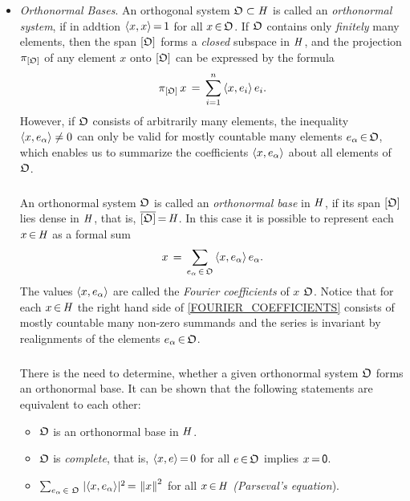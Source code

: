 \documentclass[11pt,twoside]{article}
\begin{document}
\begin{itemize}[leftmargin=5mm,itemsep=5pt]
\item[4.] \textit{Orthonormal Bases}.
An orthogonal system $\mathfrak{O} \subset \mathit{H}$ is called
an \textit{orthonormal system},
if in addtion $\langle x,x \rangle {\,=\,} 1$ for all $x {\,\in\,} \mathfrak{O}$.
If $\mathfrak{O}$ contains only \textit{finitely} many elements,
then the span $[\mathfrak{O}]$ forms a \textit{closed} subspace in $\mathit{H}$,
and the projection $\pi_{[\mathfrak{O}]}$ of any element $x$ onto $[\mathfrak{O}]$
can be expressed by the formula
\[
\pi_{[\mathfrak{O}]} \, x \,=\, \sum_{i=1}^n \, \langle x,e_i \rangle \, e_i.
\]
However,
if $\mathfrak{O}$ consists of arbitrarily many elements,
the inequality $\langle x,e_{\alpha} \rangle \neq 0$ can only be valid
for mostly countable many elements $e_{\alpha} {\,\in\,} \mathfrak{O}$,
which enables us to summarize the coefficients $\langle x,e_{\alpha} \rangle$
about all elements of $\mathfrak{O}$.

\subparagraph*{}
An orthonormal system $\mathfrak{O}$ is called
an \textit{orthonormal base} in $\mathit{H}$,
if its span $[ \mathfrak{O} ]$ lies dense in $\mathit{H}$,
that is,
${\overline{ [ \mathfrak{O} ] }} {\,=\,} \mathit{H}$.
In this case it is possible to represent each $x {\,\in\,} \mathit{H}$ as a formal sum
\begin{equation}\label{FOURIER_COEFFICIENTS}
x \,=\, \sum_{e_{\alpha} {\,\in\,} \mathfrak{O}} \, \langle x,e_{\alpha} \rangle \, e_{\alpha}.
\end{equation}
The values $\langle x,e_{\alpha} \rangle$ are called
the \textit{Fourier coefficients} of $x$ {\wrt} $\mathfrak{O}$.
Notice that for each $x {\,\in\,} \mathit{H}$
the right hand side of \eqref{FOURIER_COEFFICIENTS}
consists of mostly countable many non-zero summands and the series is invariant
by realignments of the elements $e_{\alpha} {\,\in\,} \mathfrak{O}$.

\subparagraph{}
There is the need to determine,
whether a given orthonormal system $\mathfrak{O}$ forms an orthonormal base.
It can be shown that
the following statements are equivalent to each other:

\begin{itemize}[leftmargin=20pt]
\item[(i)]
$\mathfrak{O}$ is an orthonormal base in $\mathit{H}$.

\item[(ii)]
$\mathfrak{O}$ is \textit{complete},
that is,
$\langle x,e \rangle {\,=\,} 0$ for all $e {\,\in\,} \mathfrak{O}$ implies $x {\,=\,} {\mathsf{0}}$.

\item[(iii)]
$\sum_{e_{\alpha} \xeof \,\orthO} \;
\abs{ \scalar{x}{e_{\alpha}} } ^2
\eq
\norm{x}^2$ for all $x {\,\in\,} \mathit{H}$ \textit{(Parseval}\textit{'s equation}).
\end{itemize}


\end{itemize}
\end{document}
